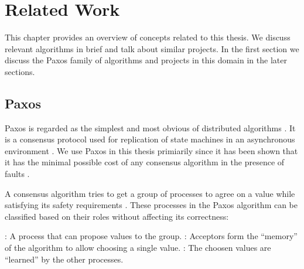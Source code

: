 \chapter{Related Work}
\label{chapter:related.work}

This chapter provides an overview of concepts related to this thesis. We
discuss relevant algorithms in brief and talk about similar projects. In the 
first section we discuss the Paxos family of algorithms and projects in 
this domain in the later sections.

\section{Paxos}
\label{section:paxos}

Paxos is regarded as the simplest and most obvious of distributed algorithms 
\citep{Lamport01}. It is a consensus protocol used for replication of state
machines in an asynchronous environment \citep{Lamport98}. We use Paxos in this
thesis primiarily since it has been shown that it has the minimal possible cost 
of any consensus algorithm in the presence of faults \citep{KeidarR03}.

A consensus algorithm tries to get a group of processes to agree on a value 
while satisfying its safety requirements%
. 
These processes in the Paxos algorithm can be classified based on their roles
without affecting its correctness:

\begin{itemize}
  : A process that can propose values to the group. 
  : Acceptors form the ``memory'' of the algorithm to 
    allow choosing a single value.
  : The choosen values are ``learned'' by the other 
    processes.
\end{itemize}

